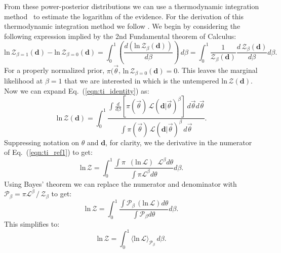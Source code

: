 From these power-posterior distributions we can use a thermodynamic integration method~\citep{lartillot2006computing,friel2008marginal} to estimate the logarithm of the evidence. For the derivation of this thermodynamic integration method we follow \citep{annis2019thermodynamic}.
We begin by considering the following expression implied by the 2nd Fundamental theorem of Calculus:
\begin{equation}\label{eqn:ti_identity}
    \mathrm{ln} \, \mathcal{Z}_{\beta=1}\left(\mathbf{d}\right) - \mathrm{ln} \, \mathcal{Z}_{\beta=0}\left(\mathbf{d}\right) = \int^1_0 \left(\frac{d\left(\mathrm{ln} \, \mathcal{Z}_\beta \left(\mathbf{d}\right) \right)}{d\beta}\right) \, d\beta = \int^1_0 \frac{1}{\mathcal{Z}_\beta \left(\mathbf{d}\right)} \frac{d \, \mathcal{Z}_\beta \left(\mathbf{d}\right)}{d\beta} d\beta.
\end{equation}
For a properly normalized prior, $\pi(\vec{\theta}$, $\mathrm{ln} \, \mathcal{Z}_{\beta=0} \left(\mathbf{d}\right) = 0$. This leaves the marginal likelihood at $\beta=1$ that we are interested in which is the untempered $\mathrm{ln} \, \mathcal{Z} \left(\mathbf{d}\right)$. Now we can expand Eq.~(\ref{eqn:ti_identity}) as:
\begin{equation}
    \mathrm{ln} \, \mathcal{Z} \left(\mathbf{d}\right) = \int_0^1 \frac{\int \frac{d}{d\beta} \left[\pi\left(\vec{\theta}\right) \, \mathcal{L} \left(\mathbf{d}|\vec{\theta} \right)^\beta \right]\, d\vec{\theta} d\vec{\theta}}{\int \pi\left(\vec{\theta}\right) \, \mathcal{L}\left(\mathbf{d}|\vec{\theta} \right)^\beta \, d\vec{\theta}}.
\end{equation}\label{eqn:ti_ref1}
Suppressing notation on $\theta$ and $\mathbf{d}$, for clarity, we the derivative in the numerator of Eq.~(\ref{eqn:ti_ref1}) to get:
\begin{equation}
    \mathrm{ln} \, \mathcal{Z} = \int^1_0 \frac{\int \pi \, \, \, \left(\mathrm{ln} \, \mathcal{L}\right) \, \, \, \mathcal{L}^{\beta} d\theta}{\int \pi \mathcal{L}^{\beta} d\theta} d\beta.
\end{equation}
Using Bayes' theorem we can replace the numerator and denominator with $\mathcal{P}_\beta = \pi \mathcal{L}^\beta \, / \, \mathcal{Z}_\beta$ to get:
\begin{equation}
    \mathrm{ln} \, \mathcal{Z} = \int^1_0 \frac{\int \mathcal{P}_\beta \, \left(\mathrm{ln} \, \mathcal{L}\right) d\theta}{\int \mathcal{P}_\beta   d\theta} d\beta.
\end{equation}
This simplifies to:
\begin{equation}
   \mathrm{ln} \, \mathcal{Z} = \int^1_0 \langle \mathrm{ln} \, \mathcal{L} \rangle_{\mathcal{P}_\beta} \, d\beta.
\end{equation}\label{eq:thermoint}
